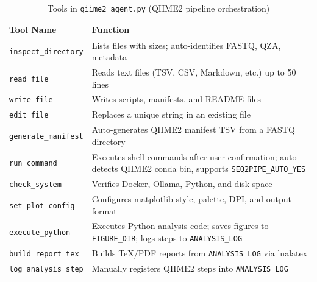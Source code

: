 \documentclass[12pt, a4paper]{article}
\begin{document}
\begin{table}[h]
  \centering
  \caption{Tools in \texttt{qiime2\_agent.py} (QIIME2 pipeline orchestration)}
  \label{tab:tools_qiime2}
  \begin{tabular}{lp{7.5cm}}
    \toprule
    \textbf{Tool Name} & \textbf{Function} \\
    \midrule
    \texttt{inspect\_directory} &
      Lists files with sizes; auto-identifies FASTQ, QZA, metadata \\
    \texttt{read\_file} &
      Reads text files (TSV, CSV, Markdown, etc.) up to 50 lines \\
    \texttt{write\_file} &
      Writes scripts, manifests, and README files \\
    \texttt{edit\_file} &
      Replaces a unique string in an existing file \\
    \texttt{generate\_manifest} &
      Auto-generates QIIME2 manifest TSV from a FASTQ directory \\
    \texttt{run\_command} &
      Executes shell commands after user confirmation;
      auto-detects QIIME2 conda bin, supports \texttt{SEQ2PIPE\_AUTO\_YES} \\
    \texttt{check\_system} &
      Verifies Docker, Ollama, Python, and disk space \\
    \texttt{set\_plot\_config} &
      Configures matplotlib style, palette, DPI, and output format \\
    \texttt{execute\_python} &
      Executes Python analysis code; saves figures to \texttt{FIGURE\_DIR};
      logs steps to \texttt{ANALYSIS\_LOG} \\
    \texttt{build\_report\_tex} &
      Builds TeX/PDF reports from \texttt{ANALYSIS\_LOG} via lualatex \\
    \texttt{log\_analysis\_step} &
      Manually registers QIIME2 steps into \texttt{ANALYSIS\_LOG} \\
    \bottomrule
  \end{tabular}
\end{table}
\end{document}
